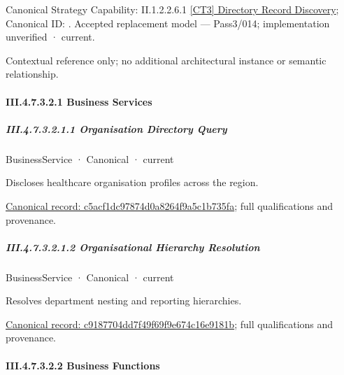 {\small Canonical Strategy Capability: II.1.2.2.6.1 \hyperref[element:2bebb37d407a4816aed79e9a13e324e9]{[CT3] Directory Record Discovery}; Canonical ID: \texttt{}. Accepted replacement model — Pass3/014; implementation unverified · current.}\par
Contextual reference only; no additional architectural instance or semantic relationship.\par
\paragraph*{III.4.7.3.2.1 Business Services}
\label{navigation:III.4.7.3.2.1}

\subparagraph*{III.4.7.3.2.1.1 Organisation Directory Query}
\label{navigation:III.4.7.3.2.1.1}

\label{element:c5acf1dc97874d0a8264f9a5c1b735fa}
{\small BusinessService · Canonical · current}\par

Discloses healthcare organisation profiles across the region.


{\footnotesize \href{../../../../continuum/business/business-service/c5acf1dc97874d0a8264f9a5c1b735fa.md}{Canonical record: c5acf1dc97874d0a8264f9a5c1b735fa}; full qualifications and provenance.}\par
\subparagraph*{III.4.7.3.2.1.2 Organisational Hierarchy Resolution}
\label{navigation:III.4.7.3.2.1.2}

\label{element:c9187704dd7f49f69f9e674c16e9181b}
{\small BusinessService · Canonical · current}\par

Resolves department nesting and reporting hierarchies.


{\footnotesize \href{../../../../continuum/business/business-service/c9187704dd7f49f69f9e674c16e9181b.md}{Canonical record: c9187704dd7f49f69f9e674c16e9181b}; full qualifications and provenance.}\par
\paragraph*{III.4.7.3.2.2 Business Functions}
\label{navigation:III.4.7.3.2.2}

